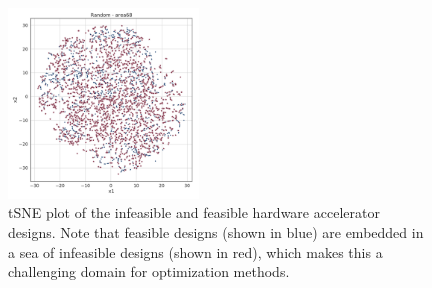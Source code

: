 \begin{table}[t!]
\small{
\begin{center}
\caption{\footnotesize {The evaluated applications, their model parameter size, number of compute operations, and normalized compute-to-memory ratio.}}
\label{tab:compute_memory_ratio}
\vspace{-0.1in}
\end{center}
\vspace{-0.1cm}
}
\end{table}

\begin{figure}[ht]
    \centering
    \includegraphics[width=0.45\textwidth]{figs/tsne/tsne_infeasible.pdf}
    \caption{tSNE plot of the infeasible and feasible hardware accelerator designs. Note that feasible designs (shown in blue) are embedded in a sea of infeasible designs (shown in red), which makes this a challenging domain for optimization methods.}
    \label{fig:tsne_infeasible}
    \vspace{-0.1in}
\end{figure}

